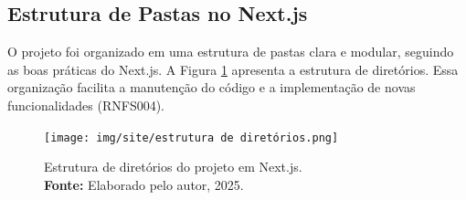     \subsection{Estrutura de Pastas no Next.js} O projeto foi organizado em uma estrutura de pastas clara e modular, seguindo as boas práticas do Next.js. A Figura \ref{fig:estrutura_pastas} apresenta a estrutura de diretórios. Essa organização facilita a manutenção do código e a implementação de novas funcionalidades (RNFS004).

\begin{figure}[H]
    \centering
    \texttt{[image: img/site/estrutura de diretórios.png]}
    \caption{ Estrutura de diretórios do projeto em Next.js. \\
        \textbf{Fonte:} Elaborado pelo autor, 2025.}
    \label{fig:estrutura_pastas}
\end{figure}

